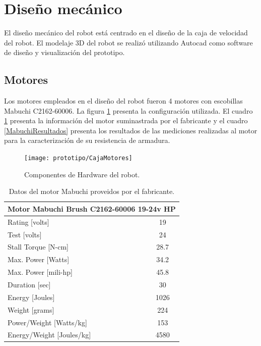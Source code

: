 \section{Diseño mecánico}


El diseño mecánico del robot está centrado en el diseño de la caja de velocidad del robot. El modelaje 3D del robot se realizó utilizando Autocad como software de diseño y visualización del prototipo.



\subsection{Motores}

Los motores empleados en el diseño del robot fueron 4 motores con escobillas Mabuchi  C2162-60006. La figura \ref{imagen:prototipo/CajaMotores} presenta la configuración utilizada. El cuadro \ref{MabuchiDatasheet} presenta la información del motor suminastrada por el fabricante y el cuadro \ref{MabuchiResultados} presenta los resultados de las mediciones realizadas al motor para la caracterización de su resistencia de armadura.

\begin{figure}[H]
	\centering
	\texttt{[image: prototipo/CajaMotores]}
	\caption[Motores Mabuchi empleados en el diseño del prototipo]{Componentes de Hardware del robot.}
	\label{imagen:prototipo/CajaMotores}
\end{figure}

\begin{table}[htbp]
	\caption{Datos del motor Mabuchi proveidos por el fabricante.}
	\centering
	\begin{tabular}{|l|c|}
		\hline
		\multicolumn{ 2}{|c|}{\textbf{Motor  Mabuchi Brush C2162-60006 19-24v HP}} \\ \hline
		Rating [volts] & 19 \\ \hline
		Test [volts] & 24 \\ \hline
		Stall Torque [N-cm] & 28.7 \\ \hline
		Max. Power [Watts] & 34.2 \\ \hline
		Max. Power [mili-hp] & 45.8 \\ \hline
		Duration [sec] & 30 \\ \hline
		Energy [Joules] & 1026 \\ \hline
		Weight [grams] & 224 \\ \hline
		Power/Weight [Watts/kg] & 153 \\ \hline
		Energy/Weight [Joules/kg] & 4580 \\ \hline
	\end{tabular}
	\label{MabuchiDatasheet}
\end{table}



